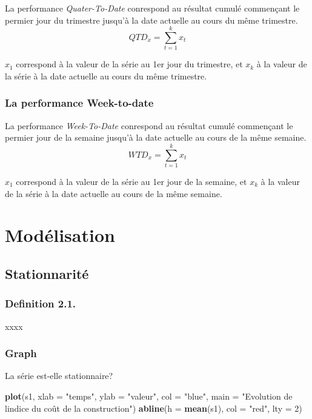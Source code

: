 \documentclass[
]{book}
\newenvironment{Shaded}{\begin{snugshade}}{\end{snugshade}}
\newcommand{\AttributeTok}[1]{\textcolor[rgb]{0.13,0.29,0.53}{#1}}
\newcommand{\DecValTok}[1]{\textcolor[rgb]{0.00,0.00,0.81}{#1}}
\newcommand{\FunctionTok}[1]{\textcolor[rgb]{0.13,0.29,0.53}{\textbf{#1}}}
\newcommand{\NormalTok}[1]{#1}
\newcommand{\StringTok}[1]{\textcolor[rgb]{0.31,0.60,0.02}{#1}}
\theoremstyle{definition}
\theoremstyle{definition}
\theoremstyle{definition}
\theoremstyle{definition}
\theoremstyle{remark}
\begin{document}
La performance \emph{Quater-To-Date} conrespond au résultat cumulé commençant le permier jour du trimestre jusqu'à la date actuelle au cours du même trimestre.
\[QTD_x = \sum_{t=1}^{k} x_{t}\]

\(x_1\) correspond à la valeur de la série au 1er jour du trimestre, et \(x_k\) à la valeur de la série à la date actuelle au cours du même trimestre.

\hypertarget{la-performance-week-to-date}{%
\subsection{La performance Week-to-date}\label{la-performance-week-to-date}}

La performance \emph{Week-To-Date} conrespond au résultat cumulé commençant le permier jour de la semaine jusqu'à la date actuelle au cours de la même semaine.
\[WTD_x = \sum_{t=1}^{k} x_{t}\]

\(x_1\) correspond à la valeur de la série au 1er jour de la semaine, et \(x_k\) à la valeur de la série à la date actuelle au cours de la même semaine.

\hypertarget{cross}{%
\chapter{Modélisation}\label{cross}}

\hypertarget{stationnarituxe9}{%
\section{Stationnarité}\label{stationnarituxe9}}

\hypertarget{definition-2.1.}{%
\subsection{Definition 2.1.}\label{definition-2.1.}}

xxxx

\hypertarget{graph}{%
\subsection{Graph}\label{graph}}

La série est‐elle stationnaire?

\begin{Shaded}
\begin{Highlighting}[]
\FunctionTok{plot}\NormalTok{(s1, }\AttributeTok{xlab =} \StringTok{"temps"}\NormalTok{, }\AttributeTok{ylab =} \StringTok{"valeur"}\NormalTok{, }\AttributeTok{col =} \StringTok{"blue"}\NormalTok{, }
     \AttributeTok{main =} \StringTok{"Evolution de l\textquotesingle{}indice du coût de la construction"}\NormalTok{)}
\FunctionTok{abline}\NormalTok{(}\AttributeTok{h =} \FunctionTok{mean}\NormalTok{(s1), }\AttributeTok{col =} \StringTok{"red"}\NormalTok{, }\AttributeTok{lty =} \DecValTok{2}\NormalTok{)}
\end{Highlighting}
\end{Shaded}
\end{document}
